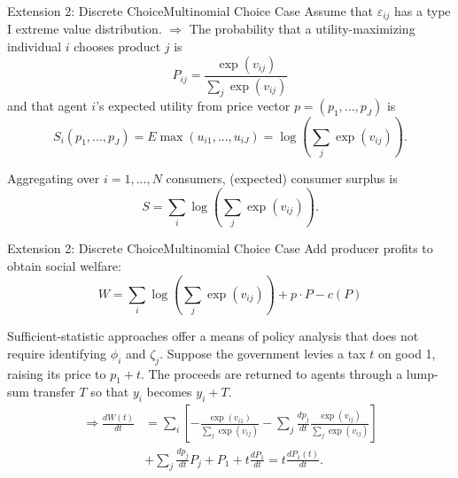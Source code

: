 \documentclass{beamer}
\begin{document}
\begin{frame}{Extension 2: Discrete Choice}{Multinomial Choice Case}
	Assume that $\varepsilon_{ij}$ has a type I extreme value distribution. $\Rightarrow$ The probability that a utility-maximizing individual $i$ chooses product $j$ is
	\begin{equation}
		P_{ij} = \frac{\exp(v_{ij})}{\sum_j \exp(v_{ij})}
	\end{equation}
	and that agent $i$'s expected utility from price vector $p=(p_1,...,p_J)$ is
	\begin{equation}
		S_i(p_1,...,p_J) = E\max(u_{i1},...,u_{iJ}) = \log \left(\sum_j\exp(v_{ij})\right).
	\end{equation}

	Aggregating over $i=1,...,N$ consumers, (expected) consumer surplus is
	\begin{equation}
		S = \sum_i\log\left(\sum_j\exp(v_{ij}) \right).
	\end{equation}
\end{frame}
\begin{frame}{Extension 2: Discrete Choice}{Multinomial Choice Case}
	Add producer profits to obtain social welfare:
	\begin{equation}
		W = \sum_i\log\left(\sum_j\exp(v_{ij})\right) + p\cdot P-c(P)
	\end{equation}

	Sufficient-statistic approaches offer a means of policy analysis that does not require identifying $\phi_i$ and $\zeta_j$. Suppose the government levies a tax $t$ on good 1, raising its price to $p_1+t$. The proceeds are returned to agents through a lump-sum transfer $T$ so that $y_i$ becomes $y_i+T$.
	\begin{equation}
		\begin{aligned}
			\Rightarrow \frac{dW(t)}{dt} &= \sum_i\left[-\frac{\exp(v_{i1})}{\sum_j \exp(v_{ij})} - \sum_j\frac{dp_j}{dt}\frac{\exp(v_{ij})}{\sum_j \exp(v_{ij})} \right] \\
			&+ \sum_j\frac{dp_j}{dt}P_j + P_1 + t\frac{dP_1}{dt} = t\frac{dP_1(t)}{dt}.
		\end{aligned}
	\end{equation}
\end{frame}
\end{document}
